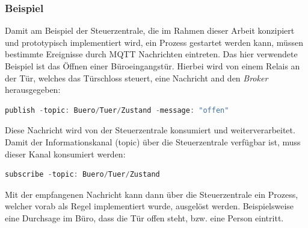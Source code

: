            \subsubsection*{Beispiel}
            \label{subsubsec:pubsub-example}
            Damit am Beispiel der Steuerzentrale, die im Rahmen dieser Arbeit konzipiert und prototypisch implementiert wird, 
            ein Prozess gestartet werden kann, müssen bestimmte Ereignisse durch \acs{MQTT} Nachrichten eintreten. Das hier 
            verwendete Beispiel ist das Öffnen einer Büroeingangstür. Hierbei wird von einem Relais an der Tür, welches das Türschloss steuert, eine Nachricht and den \textit{Broker} herausgegeben:
            \\
            \begin{lstlisting}[language=Java, frame=lines, xleftmargin=\parindent, style=algoBericht, label={code:entity}, captionpos=b, caption={Erzeugung und Veröffentlichung einer Nachricht}]
                publish -topic: Buero/Tuer/Zustand -message: "offen"
            \end{lstlisting}
            Diese Nachricht wird von der Steuerzentrale konsumiert und weiterverarbeitet. Damit der Informationskanal (topic) 
            über die Steuerzentrale verfügbar ist, muss dieser Kanal konsumiert werden: 
            \\
            \begin{lstlisting}[language=Java, frame=lines, xleftmargin=\parindent, style=algoBericht, label={code:entity}, captionpos=b, caption={Empfang und Konsum einer Nachricht}]
                subscribe -topic: Buero/Tuer/Zustand
            \end{lstlisting}
            Mit der empfangenen Nachricht kann dann über die Steuerzentrale ein Prozess, welcher vorab als Regel implementiert wurde, ausgelöst werden. Beispielsweise eine Durchsage im Büro, dass die Tür offen steht, bzw. eine Person eintritt.
    \pagebreak
